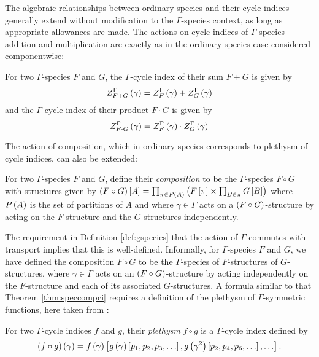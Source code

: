 \documentclass[sectionflow,singlespace,twoside,boldmathhdr,draft]{brandiss} %
\numberwithin{section}{chapter}
\numberwithin{figure}{chapter}
\begin{document}
The algebraic relationships between ordinary species and their cycle indices generally extend without modification to the $\Gamma$-species context, as long as appropriate allowances are made.
The actions on cycle indices of $\Gamma$-species addition and multiplication are exactly as in the ordinary species case considered componentwise:
\begin{definition}
  \label{def:gspecsumprod}
  For two $\Gamma$-species $F$ and $G$, the $\Gamma$-cycle index of their sum $F + G$ is given by
  \begin{equation}
    \label{eq:gspecsum}
     Z_{F + G}^{{\Gamma} {}}  \left( {\gamma} \right) =  Z_{F}^{{\Gamma} {}}  \left( {\gamma} \right) +  Z_{G}^{{\Gamma} {}}  \left( {\gamma} \right)
  \end{equation}
  and the $\Gamma$-cycle index of their product $F \cdot G$ is given by
  \begin{equation}
    \label{eq:gspecprod}
     Z_{F \cdot G}^{{\Gamma} {}}  \left( {\gamma} \right) =  Z_{F}^{{\Gamma} {}}  \left( {\gamma} \right) \cdot  Z_{G}^{{\Gamma} {}}  \left( {\gamma} \right)
  \end{equation}
\end{definition}
The action of composition, which in ordinary species corresponds to plethysm of cycle indices, can also be extended:
\begin{definition}
  \label{def:gspeccomp}
  For two $\Gamma$-species $F$ and $G$, define their \emph{composition} to be the $\Gamma$-species $F \circ G$ with structures given by $\left( {F \circ G} \right) \left[ {A} \right] = \prod_{\pi \in P \left( {A} \right)} \left( {F \left[ {\pi} \right] \times \prod_{B \in \pi} G \left[ {B} \right]} \right)$ where $P \left( {A} \right)$ is the set of partitions of $A$ and where $\gamma \in \Gamma$ acts on a $\left( {F \circ G} \right)$-structure by acting on the $F$-structure and the $G$-structures independently.
\end{definition}
The requirement in Definition \ref{def:gspecies} that the action of $\Gamma$ commutes with transport implies that this is well-defined.
Informally, for $\Gamma$-species $F$ and $G$, we have defined the composition $F \circ G$ to be the $\Gamma$-species of $F$-structures of $G$-structures, where $\gamma \in \Gamma$ acts on an $\left( {F \circ G} \right)$-structure by acting independently on the $F$-structure and each of its associated $G$-structures.
A formula similar to that Theorem \ref{thm:speccompci} requires a definition of the plethysm of $\Gamma$-symmetric functions, here taken from \cite[\S 3]{hend:specfield}:
\begin{definition}
  \label{def:gcipleth}
  For two $\Gamma$-cycle indices $f$ and $g$, their \emph{plethysm} $f \circ g$ is a $\Gamma$-cycle index defined by
  \begin{equation}
    \left( {f \circ g} \right) \left( {\gamma} \right) = f \left( {\gamma} \right) \left[ {g \left( {\gamma} \right) \left[ {p_{1}, p_{2}, p_{3}, \dots} \right], g \left( {\gamma^{2}} \right) \left[ {p_{2}, p_{4}, p_{6}, \dots} \right], \dots} \right].
    \label{eq:gcipleth}
  \end{equation}
\end{definition}
\end{document}
